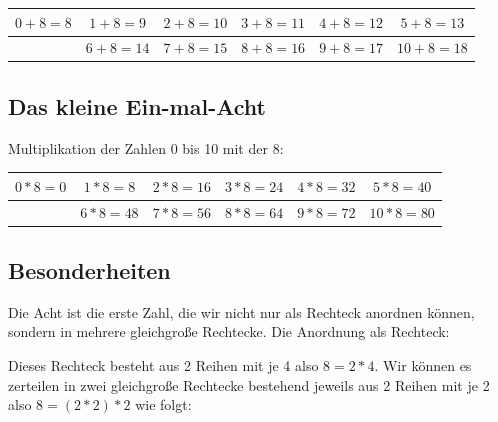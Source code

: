 \documentclass[a4paper]{amsart}
\theoremstyle{definition}
\begin{document}
\begin{tabular}{|c|c|c|c|c|c|}
   \hline
   $0 + 8 = 8$ & $1 + 8 = 9$ & $2 + 8 = 10$ & $3 + 8 = 11$ & $4 + 8 = 12$ & $5 + 8 = 13$\\ 
   \hline
               & $6 + 8 = 14$ & $7 + 8 = 15$ & $8 + 8 = 16$ & $9 + 8 = 17$ & $10 + 8 = 18$ \\
   \hline
\end{tabular}

\subsection{Das kleine Ein-mal-Acht}
Multiplikation der Zahlen 0 bis 10 mit der 8:
\vspace{\kategoryVspace}

\begin{tabular}{|c|c|c|c|c|c|}
   \hline
   $0 * 8 = 0$ & $1 * 8 = 8$ & $2 * 8 = 16$ & $3 * 8 = 24$ & $4 * 8 = 32$ & $5 * 8 = 40$\\ 
   \hline
   & $6 * 8 = 48$ & $7 * 8 = 56$ & $8 * 8 = 64$ & $9 * 8 = 72$ & $10 * 8 = 80$ \\
   \hline
\end{tabular}
\subsection{Besonderheiten}
Die Acht ist die erste Zahl, die wir nicht nur als Rechteck anordnen können, sondern in mehrere gleichgroße Rechtecke. Die Anordnung als Rechteck:


Dieses Rechteck besteht aus 2 Reihen mit je 4 also $8 = 2 * 4$. Wir können es zerteilen in zwei gleichgroße Rechtecke bestehend jeweils aus 2 Reihen mit je 2 also $8 = (2 * 2)* 2$ wie folgt:
\end{document}
